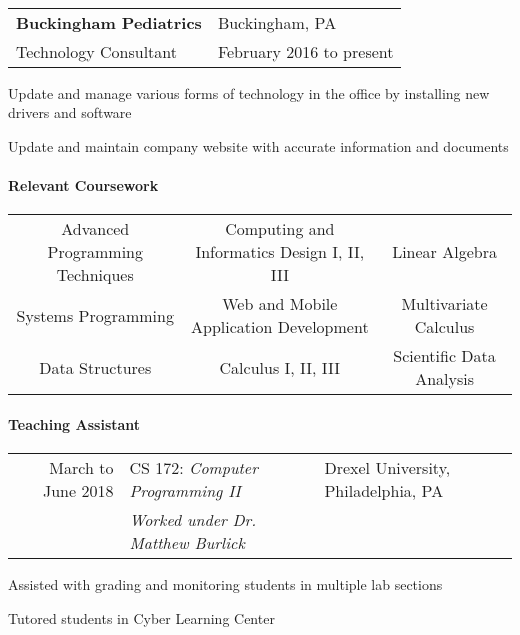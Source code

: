 \documentclass[10pt,]{article}
\let\oldparagraph\paragraph
\renewcommand{\paragraph}[1]{\oldparagraph{#1}\mbox{}}
\begin{document}
~

\begin{tabularx}{\textwidth}{l X}
    \textbf{Buckingham Pediatrics} & \hfill Buckingham, PA\\
    Technology Consultant          & \hfill February 2016 to present
\end{tabularx}

\begin{list}{\quad}{}
    \item Update and manage various forms of technology in the office by installing new drivers and software
    \item Update and maintain company website with accurate information and documents
\end{list}

\hypertarget{relevant-coursework}{%
\paragraph{Relevant Coursework}\label{relevant-coursework}}

\begin{center}
    \begin{tabularx}{\textwidth}{ccc}
        Advanced Programming Techniques & Computing and Informatics Design I, II, III & Linear Algebra\\
        Systems Programming & Web and Mobile Application Development & Multivariate Calculus\\
        Data Structures & Calculus I, II, III & Scientific Data Analysis \\
    \end{tabularx}
\end{center}

\hypertarget{teaching-assistant}{%
\paragraph{Teaching Assistant}\label{teaching-assistant}}

\begin{tabularx}{\textwidth}{r | l X}
March to June 2018 & CS 172: \textit{Computer Programming II} & \hfill Drexel University, Philadelphia, PA\\
           & \textit{Worked under Dr. Matthew Burlick}
\end{tabularx}
\begin{list}{\quad}
    \item Assisted with grading and monitoring students in multiple lab sections
    \item Tutored students in Cyber Learning Center
\end{list}
\end{document}
